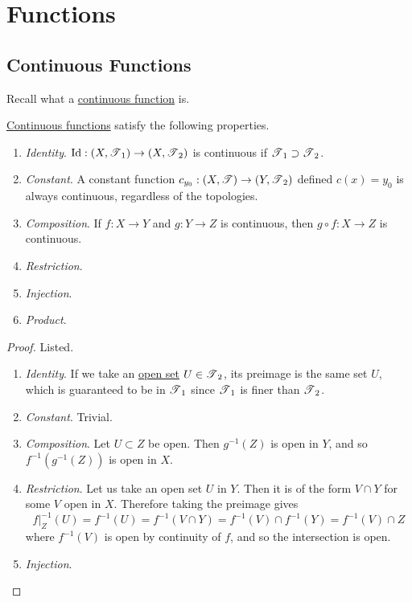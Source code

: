\section{Functions} 

\subsection{Continuous Functions}

	Recall what a \href{def:continuous_func}{continuous function} is. 

	\begin{lemma}
	  \label{thm:properties-of-continuous-functions}
		\hyperref[def:continuous_func]{Continuous functions} satisfy the following properties. 
		\begin{enumerate}
			\item \textit{Identity}. $\operatorname{Id}: (X, \operatorname{\mathscr{T}}_1) \rightarrow (X, \operatorname{\mathscr{T}}_2)$ is continuous if $\operatorname{\mathscr{T}}_1 \supset \operatorname{\mathscr{T}}_2$. 
			\item \textit{Constant}. A constant function $c_{y_0}: (X, \operatorname{\mathscr{T}}) \rightarrow (Y, \operatorname{\mathscr{T}}_2)$ defined $c(x) = y_0$ is always continuous, regardless of the topologies. 
		  \item \textit{Composition}. If $f: X \rightarrow Y$ and $g: Y \rightarrow Z$ is continuous, then $g \circ f :X \rightarrow Z$ is continuous. 
			\item \textit{Restriction}. 
			\item \textit{Injection}. 
			\item \textit{Product}. 
		\end{enumerate}
	\end{lemma}
  \begin{proof}
    Listed. 
    \begin{enumerate}
			\item \textit{Identity}. If we take an \hyperref[def:open-set]{open set} $U \in \operatorname{\mathscr{T}}_2$, its preimage is the same set $U$, which is guaranteed to be in $\operatorname{\mathscr{T}}_1$ since $\operatorname{\mathscr{T}}_1$ is finer than $\operatorname{\mathscr{T}}_2$. 

			\item \textit{Constant}. Trivial. 

			\item \textit{Composition}. Let $U \subset Z$ be open. Then $g^{-1}(Z)$ is open in $Y$, and so $f^{-1}(g^{-1}(Z))$ is open in $X$. 

			\item \textit{Restriction}. Let us take an open set $U$ in $Y$. Then it is of the form $V \cap Y$ for some $V$ open in $X$. Therefore taking the preimage gives 
				\begin{equation}
					f|_{Z}^{-1} (U) = f^{-1} (U) = f^{-1} (V \cap Y) = f^{-1} (V) \cap f^{-1} (Y) = f^{-1} (V) \cap Z
				\end{equation}
				where $f^{-1} (V)$ is open by continuity of $f$, and so the intersection is open. 

			\item \textit{Injection}. 
    \end{enumerate}
  \end{proof}

